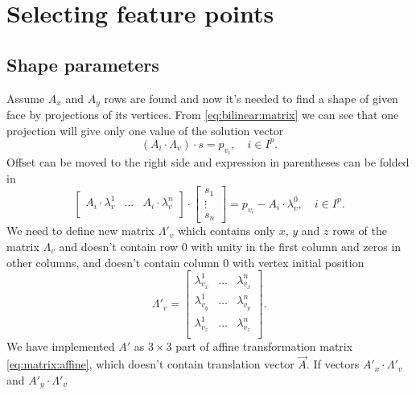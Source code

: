 \section{Selecting feature points}

\subsection{Shape parameters}

Assume $A_x$ and $A_y$ rows are found
and now it's needed to find a shape of given face
by projections of its vertices.
From \eqref{eq:bilinear:matrix} we can see that one projection
will give only one value of the solution vector
\begin{equation*}
  \left( A_i \cdot \Lambda_v \right) \cdot s = p_{v_i},
  \quad i \in I^p.
\end{equation*}
Offset can be moved to the right side and
expression in parentheses can be folded in
\begin{equation}\label{eq:linear:shape:first}
  \begin{bmatrix}
    A_i \cdot \lambda^1_v & \dots & A_i \cdot \lambda^n_v \\
  \end{bmatrix}
  \cdot \begin{bmatrix}
    s_1 \\
    \vdots \\
    s_n
  \end{bmatrix}
  = p_{v_i} - A_i \cdot \lambda^0_v,
  \quad i \in I^p.
\end{equation}
We need to define new matrix $\Lambda'_v$ which contains only $x$, $y$ and $z$
rows of the matrix $\Lambda_v$ and doesn't contain row $0$
with unity in the first column and zeros in other columns,
and doesn't contain column $0$ with vertex initial position
\begin{equation*}
  \Lambda'_v = \begin{bmatrix}
    \lambda^1_{v_x} & \dots & \lambda^n_{v_x} \\
    \lambda^1_{v_y} & \dots & \lambda^n_{v_y} \\
    \lambda^1_{v_z} & \dots & \lambda^n_{v_z} \\
  \end{bmatrix}.
\end{equation*}
We have implemented $A'$ as $3 \times 3$ part of
affine transformation matrix \eqref{eq:matrix:affine},
which doesn't contain translation vector $\vec{A}$.
If vectors $A'_x \cdot \Lambda'_v$ and $A'_y \cdot \Lambda'_v$
